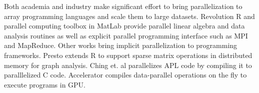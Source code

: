Both academia and industry make significant effort to bring parallelization to
array programming languages and scale them to large datasets. Revolution R
\cite{rre} and parallel computing toolbox in MatLab \cite{matlab} provide
parallel linear algebra and data analysis routines as well as explicit
parallel programming interface such as MPI and MapReduce. Other works bring
implicit parallelization to programming frameworks. Presto \cite{presto}
extends R to support sparse matrix operations in distributed memory for graph
analysis. Ching et. al \cite{Ching12} parallelizes APL code by
compiling it to paralllelized C code. Accelerator \cite{accelerator} compiles
data-parallel operations on the fly to execute programs in GPU.
